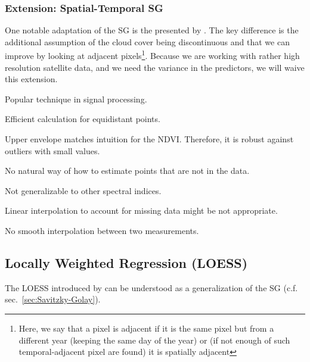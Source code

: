 		\subsubsection*{Extension: Spatial-Temporal SG}
			One notable adaptation of the SG is the presented by \cite{caoSimpleMethodImprove2018b}. The key difference is the additional assumption of the cloud cover being discontinuous and that we can improve by looking at adjacent pixels\footnote{Here, we say that a pixel is adjacent if it is the same pixel but from a different year (keeping the same day of the year) or (if not enough of such temporal-adjacent pixel are found) it is spatially adjacent}. Because we are working with rather high resolution satellite data, and we need the variance in the predictors, we will waive this extension.

		\begin{my_pros_cons_table}{
				\item Popular technique in signal processing.
				\item Efficient calculation for equidistant points.
				\item Upper envelope matches intuition for the NDVI. Therefore, it is robust against outliers with small values.
			}{
				\item No natural way of how to estimate points that are not in the data.
				\item Not generalizable to other spectral indices.
				\item Linear interpolation to account for missing data might be not appropriate.
				\item No smooth interpolation between two measurements.
			}
		\end{my_pros_cons_table}


	\subsection{Locally Weighted Regression (LOESS)}
		\label{sec:loess}

		The LOESS introduced by \cite{clevelandRobustLocallyWeighted1979} can be understood as a generalization of the SG (c.f. sec.~\ref{sec:Savitzky-Golay}).

